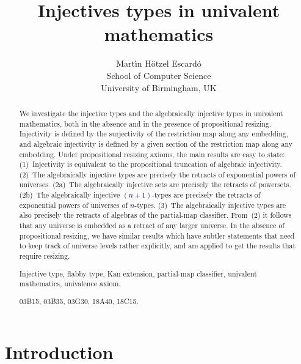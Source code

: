 \documentclass[10pt]{article}
\title{Injectives types in univalent mathematics}
\author{Mart\'{\i}n H\"otzel Escard\'o \\ School of Computer Science \\ University of Birmingham, UK}
\newcommand{\db}{\textcolor{darkblue}}
\newcommand{\m}[1]{\db{$#1$}}
\theoremstyle{definition}
\begin{document}
\maketitle

\begin{abstract}
  We investigate the injective types and the algebraically injective
  types in univalent mathematics, both in the absence and in the
  presence of propositional resizing. Injectivity is defined by the
  surjectivity of the restriction map along any embedding, and
  algebraic injectivity is defined by a given section of the
  restriction map along any embedding. Under propositional resizing
  axioms, the main results are easy to state: (1)~Injectivity is
  equivalent to the propositional truncation of algebraic injectivity.
  (2)~The algebraically injective types are precisely the retracts of
  exponential powers of universes. (2a)~The algebraically injective
  sets are precisely the retracts of powersets. (2b)~The algebraically
  injective \m{(n+1)}-types are precisely the retracts of exponential
  powers of universes of \m{n}-types. (3)~The algebraically injective
  types are also precisely the retracts of algebras of the partial-map
  classifier. From~(2) it follows that any universe is embedded as a
  retract of any larger universe.  In the absence of propositional
  resizing, we have similar results which have subtler statements that
  need to keep track of universe levels rather explicitly, and are
  applied to get the results that require resizing.

  \medskip {} Injective type, flabby type, Kan extension, partial-map classifier, univalent mathematics, univalence axiom.

  \medskip {} 03B15, 03B35, 03G30, 18A40, 18C15.
\end{abstract}

\section{Introduction}
\end{document}
